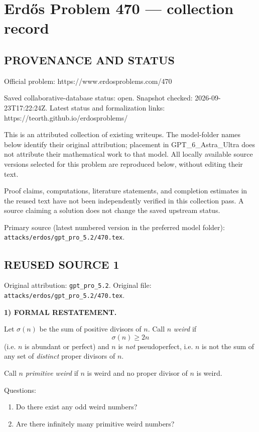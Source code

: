 \section*{Erd\H{o}s Problem 470 --- collection record}

\subsection*{PROVENANCE AND STATUS}
Official problem: https://www.erdosproblems.com/470

Saved collaborative-database status: open.
Snapshot checked: 2026-09-23T17:22:24Z.
Latest status and formalization links: https://teorth.github.io/erdosproblems/

This is an attributed collection of existing writeups. The model-folder names below identify their original attribution; placement in GPT\_6\_Astra\_Ultra does not attribute their mathematical work to that model. All locally available source versions selected for this problem are reproduced below, without editing their text.

Proof claims, computations, literature statements, and completion estimates in the reused text have not been independently verified in this collection pass. A source claiming a solution does not change the saved upstream status.

Primary source (latest numbered version in the preferred model folder): \texttt{attacks/erdos/gpt\_pro\_5.2/470.tex}.

\subsection*{REUSED SOURCE 1}
Original attribution: \texttt{gpt\_pro\_5.2}.
Original file: \texttt{attacks/erdos/gpt\_pro\_5.2/470.tex}.


\noindent\textbf{1) FORMAL RESTATEMENT.}

Let $\sigma(n)$ be the sum of positive divisors of $n$. Call $n$ \emph{weird} if
\[
\sigma(n)\ge 2n
\]
(i.e. $n$ is abundant or perfect) and $n$ is \emph{not} pseudoperfect, i.e. $n$ is not the sum of any set of \emph{distinct} proper divisors of $n$.

Call $n$ \emph{primitive weird} if $n$ is weird and no proper divisor of $n$ is weird.

Questions:
\begin{enumerate}
\item Do there exist any odd weird numbers?
\item Are there infinitely many primitive weird numbers?
\end{enumerate}

